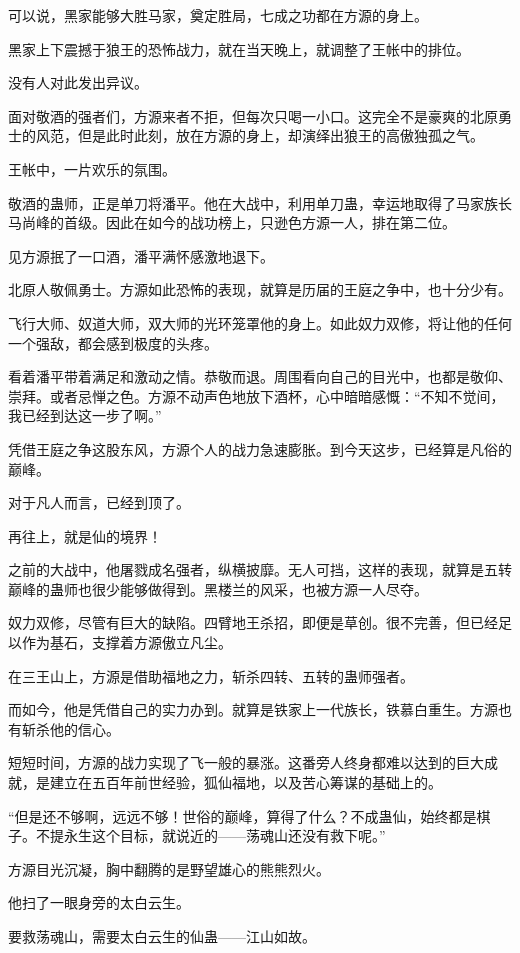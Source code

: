 \begin{this_body}
可以说，黑家能够大胜马家，奠定胜局，七成之功都在方源的身上。

黑家上下震撼于狼王的恐怖战力，就在当天晚上，就调整了王帐中的排位。

没有人对此发出异议。

面对敬酒的强者们，方源来者不拒，但每次只喝一小口。这完全不是豪爽的北原勇士的风范，但是此时此刻，放在方源的身上，却演绎出狼王的高傲独孤之气。

王帐中，一片欢乐的氛围。

敬酒的蛊师，正是单刀将潘平。他在大战中，利用单刀蛊，幸运地取得了马家族长马尚峰的首级。因此在如今的战功榜上，只逊色方源一人，排在第二位。

见方源抿了一口酒，潘平满怀感激地退下。

北原人敬佩勇士。方源如此恐怖的表现，就算是历届的王庭之争中，也十分少有。

飞行大师、奴道大师，双大师的光环笼罩他的身上。如此奴力双修，将让他的任何一个强敌，都会感到极度的头疼。

看着潘平带着满足和激动之情。恭敬而退。周围看向自己的目光中，也都是敬仰、崇拜。或者忌惮之色。方源不动声色地放下酒杯，心中暗暗感慨：“不知不觉间，我已经到达这一步了啊。”

凭借王庭之争这股东风，方源个人的战力急速膨胀。到今天这步，已经算是凡俗的巅峰。

对于凡人而言，已经到顶了。

再往上，就是仙的境界！

之前的大战中，他屠戮成名强者，纵横披靡。无人可挡，这样的表现，就算是五转巅峰的蛊师也很少能够做得到。黑楼兰的风采，也被方源一人尽夺。

奴力双修，尽管有巨大的缺陷。四臂地王杀招，即便是草创。很不完善，但已经足以作为基石，支撑着方源傲立凡尘。

在三王山上，方源是借助福地之力，斩杀四转、五转的蛊师强者。

而如今，他是凭借自己的实力办到。就算是铁家上一代族长，铁慕白重生。方源也有斩杀他的信心。

短短时间，方源的战力实现了飞一般的暴涨。这番旁人终身都难以达到的巨大成就，是建立在五百年前世经验，狐仙福地，以及苦心筹谋的基础上的。

“但是还不够啊，远远不够！世俗的巅峰，算得了什么？不成蛊仙，始终都是棋子。不提永生这个目标，就说近的——荡魂山还没有救下呢。”

方源目光沉凝，胸中翻腾的是野望雄心的熊熊烈火。

他扫了一眼身旁的太白云生。

要救荡魂山，需要太白云生的仙蛊——江山如故。


\end{this_body}
